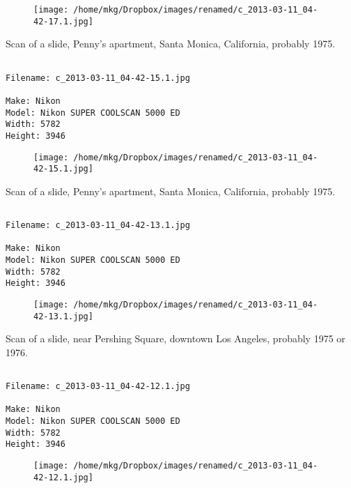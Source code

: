 \begin{figure}
\texttt{[image: /home/mkg/Dropbox/images/renamed/c\_2013-03-11\_04-42-17.1.jpg]}
\end{figure}
    
\clearpage
\onecolumn
\noindent Scan of a slide, Penny's apartment, Santa Monica, California, probably 1975.
\noindent
\begin{lstlisting}

Filename: c_2013-03-11_04-42-15.1.jpg

Make: Nikon
Model: Nikon SUPER COOLSCAN 5000 ED
Width: 5782
Height: 3946
\end{lstlisting}
\clearpage

\begin{figure}
\texttt{[image: /home/mkg/Dropbox/images/renamed/c\_2013-03-11\_04-42-15.1.jpg]}
\end{figure}
    
\clearpage
\onecolumn
\noindent Scan of a slide, Penny's apartment, Santa Monica, California, probably 1975.
\noindent
\begin{lstlisting}

Filename: c_2013-03-11_04-42-13.1.jpg

Make: Nikon
Model: Nikon SUPER COOLSCAN 5000 ED
Width: 5782
Height: 3946
\end{lstlisting}
\clearpage

\begin{figure}
\texttt{[image: /home/mkg/Dropbox/images/renamed/c\_2013-03-11\_04-42-13.1.jpg]}
\end{figure}
    
\clearpage
\onecolumn
\noindent Scan of a slide, near Pershing Square, downtown Los Angeles, probably 1975 or 1976.
\noindent
\begin{lstlisting}

Filename: c_2013-03-11_04-42-12.1.jpg

Make: Nikon
Model: Nikon SUPER COOLSCAN 5000 ED
Width: 5782
Height: 3946
\end{lstlisting}
\clearpage

\begin{figure}
\texttt{[image: /home/mkg/Dropbox/images/renamed/c\_2013-03-11\_04-42-12.1.jpg]}
\end{figure}
    
